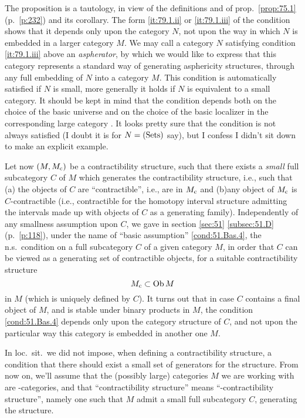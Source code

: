 The proposition is a tautology, in view of the definitions and of
prop.\ \ref{prop:75.1} (p.\ \ref{p:232}) and its corollary. The form
\ref{it:79.1.ii} or \ref{it:79.1.iii} of the condition shows that it
depends only upon the category $N$, not upon the way in which $N$ is
embedded in a larger category $M$. We may call a category $N$
satisfying condition \ref{it:79.1.iii} above an \emph{aspherator}, by
which we would like to express that this category represents a
standard way of generating asphericity structures, through any full
embedding of $N$ into a category $M$. This condition is automatically
satisfied if $N$ is small, more generally it holds if $N$ is
equivalent to a small category. It should be kept in mind that the
condition depends both on the choice of the basic universe \scrU{} and
on the choice of the basic localizer \scrW{} in the corresponding
large category \Cat. It looks pretty sure that the condition is not
always satisfied (I doubt it is for $N={(\mathrm{Sets})}$ say), but I confess I
didn't sit down to make an explicit example.

Let now $(M,M_{\mathrm{c}})$ be a contractibility structure, such
that there exists a \emph{small} full subcategory $C$ of $M$ which
generates the contractibility structure, i.e., such that (a)\enspace
the objects of $C$ are ``contractible'', i.e., are in $M_{\mathrm{c}}$ and
(b)\enspace any object of $M_{\mathrm{c}}$ is $C$-contractible (i.e.,
contractible for the homotopy interval structure admitting the
intervals made up with objects of $C$ as a generating
family). Independently of any smallness assumption upon $C$, we gave
in section \ref{sec:51} \ref{subsec:51.D} (p.\ \ref{p:118}), under the
name of ``basic assumption'' \ref{cond:51.Bas.4}, the n.s.\ condition
on a full subcategory $C$ of a given category $M$, in order that $C$
can be viewed as a generating set of contractible objects, for a
suitable contractibility structure
\[ M_{\mathrm{c}}\subset \operatorname{Ob} M\]
in $M$ (which is uniquely defined by $C$). It turns out that in case
$C$ contains a final object of $M$, and is stable under binary
products in $M$, the condition \ref{cond:51.Bas.4} depends only upon
the category structure of $C$, and not upon the particular way this
category is embedded in another one $M$.

In loc.\ sit.\ we did not impose, when defining a contractibility
structure, a condition that there should exist a small set of
generators for the structure. From now on, we'll assume that the
(possibly large) categories $M$ we are working with are
\scrU-categories, and that ``contractibility structure'' means
``\scrU-contractibility structure'', namely one such that $M$ admit a
small full subcategory $C$, generating the structure.

